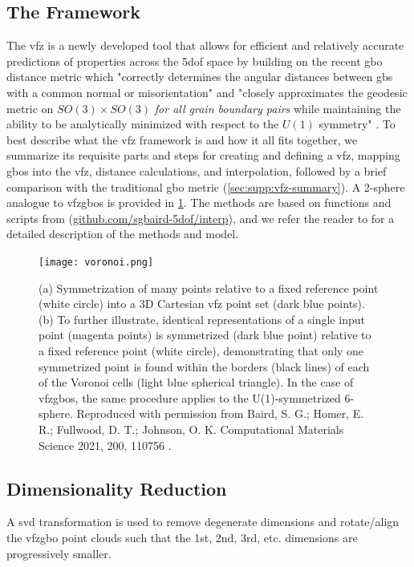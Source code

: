 \documentclass[final,twocolumn,12pt]{elsarticle}
\begin{document}
	\subsection{The  Framework}
	\label{sec:methods:framework}

    The \gls{vfz} is a newly developed tool that allows for efficient and relatively accurate predictions of properties across the \gls{5dof} space \cite{bairdFiveDegreeofFreedomPropertyUnderReview} by building on the recent \gls{gbo} distance metric which "correctly determines the angular distances between \glspl{gb} with a common normal or misorientation" and "closely approximates the geodesic metric on $SO(3) \times SO(3)$ \textit{for all grain boundary pairs} while maintaining the ability to be analytically minimized with respect to the $U(1)$ symmetry" \cite{francisGeodesicOctonionMetric2019}. To best describe what the \gls{vfz} framework is and how it all fits together, we summarize its requisite parts and steps for creating and defining a \gls{vfz}, mapping \glspl{gbo} into the \gls{vfz}, distance calculations, and interpolation, followed by a brief comparison with the traditional \gls{gbo} metric (\cref{sec:supp:vfz-summary}). A 2-sphere analogue to \glspl{vfzgbo} is provided in \cref{fig:voronoi}. The methods are based on functions and scripts from (\url{github.com/sgbaird-5dof/interp}), and we refer the reader to \citet{bairdFiveDegreeoffreedomProperty2021} for a detailed description of the methods and model.
    
    \begin{figure}
    \centering
    \texttt{[image: voronoi.png]}
    \caption{(a) Symmetrization of many points relative to a fixed reference point (white circle) into a 3D Cartesian \gls{vfz} point set (dark blue points). (b) To further illustrate, identical representations of a single input point (magenta points) is symmetrized (dark blue point) relative to a fixed reference point (white circle), demonstrating that only one symmetrized point is found within the borders (black lines) of each of the Voronoi cells (light blue spherical triangle). In the case of \glspl{vfzgbo}, the same procedure applies to the U(1)-symmetrized 6-sphere. Reproduced with permission from Baird, S. G.; Homer, E. R.; Fullwood, D. T.; Johnson, O. K. Computational Materials Science 2021, 200, 110756 \cite{bairdFiveDegreeoffreedomProperty2021}. }
    \label{fig:voronoi}
\end{figure}

    \subsection{Dimensionality Reduction} \label{sec:methods:dim-reduce}
    A \gls{svd} transformation is used to remove degenerate dimensions and rotate/align the \gls{vfzgbo} point clouds such that the 1st, 2nd, 3rd, etc. dimensions are progressively smaller.
    
\end{document}
